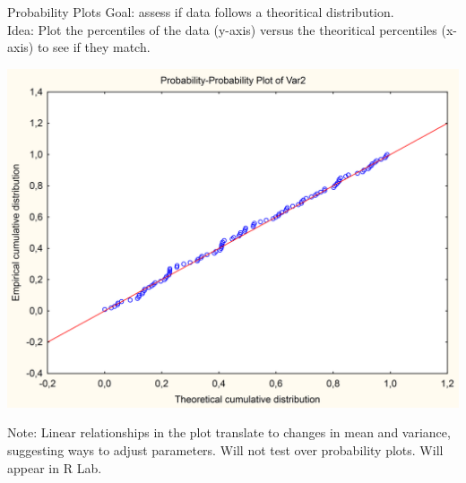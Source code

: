 \documentclass[handout]{beamer}
\begin{document}
\begin{frame}{Probability Plots}     
Goal: assess if data follows a theoritical distribution.
\\
Idea: Plot the percentiles of the data (y-axis) versus the theoritical percentiles (x-axis) to see if they match.\\
\begin{center}
\includegraphics[scale=0.06]{PP_Plot_Wiki.png}
\end{center}
Note: Linear relationships in the plot translate to changes in mean and variance, suggesting ways to adjust parameters. Will not test over probability plots. Will appear in R Lab.
\end{frame}
\end{document}
